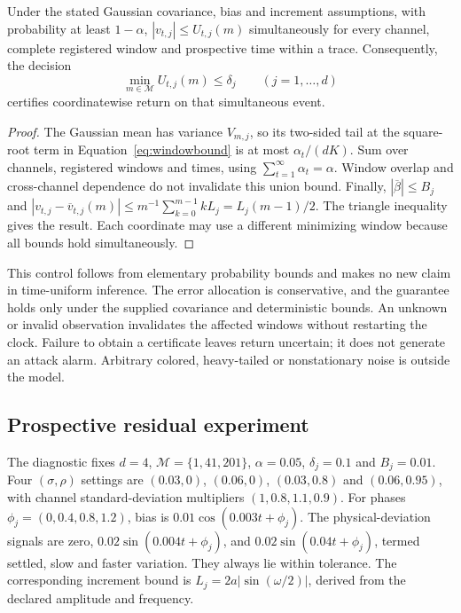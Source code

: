 \begin{proposition}
Under the stated Gaussian covariance, bias and increment assumptions, with probability at least $1-\alpha$, $|v_{t,j}|\le U_{t,j}(m)$ simultaneously for every channel, complete registered window and prospective time within a trace. Consequently, the decision
\begin{equation}
 \min_{m\in\mathcal M}U_{t,j}(m)\le\delta_j\qquad(j=1,\ldots,d)
 \label{eq:certificate}
\end{equation}
certifies coordinatewise return on that simultaneous event.
\end{proposition}
\begin{proof}
The Gaussian mean has variance $V_{m,j}$, so its two-sided tail at the square-root term in Equation~\ref{eq:windowbound} is at most $\alpha_t/(dK)$. Sum over channels, registered windows and times, using $\sum_{t=1}^{\infty}\alpha_t=\alpha$. Window overlap and cross-channel dependence do not invalidate this union bound. Finally, $|\overline\beta|\le B_j$ and
$|v_{t,j}-\overline v_{t,j}(m)|\le m^{-1}\sum_{k=0}^{m-1}kL_j=L_j(m-1)/2$.
The triangle inequality gives the result. Each coordinate may use a different minimizing window because all bounds hold simultaneously.
\end{proof}

This control follows from elementary probability bounds and makes no new claim in time-uniform inference. The error allocation is conservative, and the guarantee holds only under the supplied covariance and deterministic bounds. An unknown or invalid observation invalidates the affected windows without restarting the clock. Failure to obtain a certificate leaves return uncertain; it does not generate an attack alarm. Arbitrary colored, heavy-tailed or nonstationary noise is outside the model.

\subsection{Prospective residual experiment}
The diagnostic fixes $d=4$, $\mathcal M=\{1,41,201\}$, $\alpha=0.05$, $\delta_j=0.1$ and $B_j=0.01$. Four $(\sigma,\rho)$ settings are $(0.03,0)$, $(0.06,0)$, $(0.03,0.8)$ and $(0.06,0.95)$, with channel standard-deviation multipliers $(1,0.8,1.1,0.9)$. For phases $\phi_j=(0,0.4,0.8,1.2)$, bias is $0.01\cos(0.003t+\phi_j)$. The physical-deviation signals are zero, $0.02\sin(0.004t+\phi_j)$, and $0.02\sin(0.04t+\phi_j)$, termed settled, slow and faster variation. They always lie within tolerance. The corresponding increment bound is $L_j=2a|\sin(\omega/2)|$, derived from the declared amplitude and frequency.

